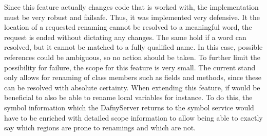 Since this feature actually changes code that is worked with, the implementation must be very robust and failsafe. Thus, it was implemented very defensive. It the location of a requested renaming cannot be resolved to a meaningful word, the request is ended without dictating any changes. The same hold if a word can resolved, but it cannot be matched to a fully qualified name. In this case, possible references could be ambiguous, so no action should be taken. To further limit the possibility for failure, the scope for this feature is very small. The current stand only allows for renaming of class members such as fields and methods, since these can be resolved with absolute certainty.\newline
When extending this feature, if would be beneficial to also be able to rename local variables for instance. To do this, the symbol information which the DafnyServer returns to the symbol service would have to be enriched with detailed scope information to allow being able to exactly say which regions are prone to renamings and which are not. 

